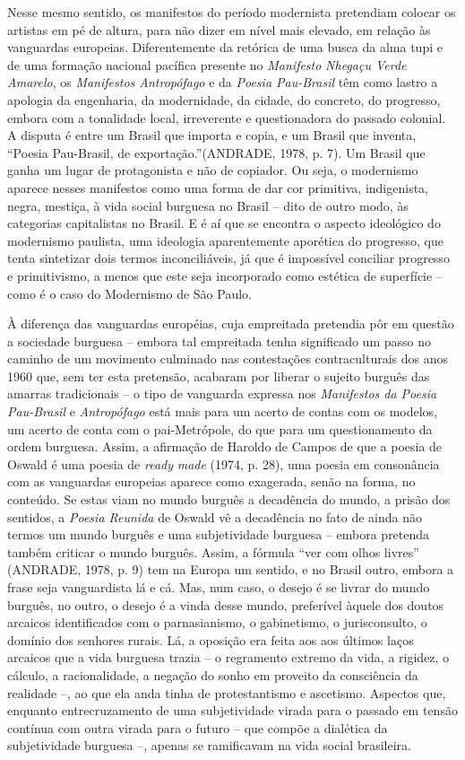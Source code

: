 Nesse mesmo sentido, os manifestos do período modernista pretendiam
colocar os artistas em pé de altura, para não dizer em nível mais
elevado, em relação às vanguardas europeias. Diferentemente da retórica
de uma busca da alma tupi e de uma formação nacional pacífica presente
no \emph{Manifesto} \emph{Nhegaçu Verde Amarelo}, os \emph{Manifestos
Antropófago} e da \emph{Poesia Pau-Brasil} têm como lastro a apologia da
engenharia, da modernidade, da cidade, do concreto, do progresso, embora
com a tonalidade local, irreverente e questionadora do passado colonial.
A disputa é entre um Brasil que importa e copia, e um Brasil que
inventa, ``Poesia Pau-Brasil, de exportação.''(ANDRADE, 1978, p. 7). Um
Brasil que ganha um lugar de protagonista e não de copiador. Ou seja, o
modernismo aparece nesses manifestos como uma forma de dar cor
primitiva, indigenista, negra, mestiça, à vida social burguesa no Brasil
-- dito de outro modo, às categorias capitalistas no Brasil. E é aí que
se encontra o aspecto ideológico do modernismo paulista, uma ideologia
aparentemente aporética do progresso, que tenta sintetizar dois termos
inconciliáveis, já que é impossível conciliar progresso e primitivismo,
a menos que este seja incorporado como estética de superfície -- como é
o caso do Modernismo de São Paulo.

À diferença das vanguardas européias, cuja empreitada pretendia pôr em
questão a sociedade burguesa -- embora tal empreitada tenha significado
um passo no caminho de um movimento culminado nas contestações
contraculturais dos anos 1960 que, sem ter esta pretensão, acabaram por
liberar o sujeito burguês das amarras tradicionais -- o tipo de
vanguarda expressa nos \emph{Manifestos da Poesia Pau-Brasil} e
\emph{Antropófago} está mais para um acerto de contas com os modelos, um
acerto de conta com o pai-Metrópole, do que para um questionamento da
ordem burguesa. Assim, a afirmação de Haroldo de Campos de que a poesia
de Oswald é uma poesia de \emph{ready} \emph{made} (1974, p. 28), uma
poesia em consonância com as vanguardas europeias aparece como
exagerada, senão na forma, no conteúdo. Se estas viam no mundo burguês a
decadência do mundo, a prisão dos sentidos, a \emph{Poesia Reunida} de
Oswald vê a decadência no fato de ainda não termos um mundo burguês e
uma subjetividade burguesa -- embora pretenda também criticar o mundo
burguês. Assim, a fórmula ``ver com olhos livres'' (ANDRADE, 1978, p. 9)
tem na Europa um sentido, e no Brasil outro, embora a frase seja
vanguardista lá e cá. Mas, num caso, o desejo é se livrar do mundo
burguês, no outro, o desejo é a vinda desse mundo, preferível àquele dos
doutos arcaicos identificados com o parnasianismo, o gabinetismo, o
jurisconsulto, o domínio dos senhores rurais. Lá, a oposição era feita
aos aos últimos laços arcaicos que a vida burguesa trazia -- o
regramento extremo da vida, a rigidez, o cálculo, a racionalidade, a
negação do sonho em proveito da consciência da realidade --, ao que ela
anda tinha de protestantismo e ascetismo. Aspectos que, enquanto
entrecruzamento de uma subjetividade virada para o passado em tensão
contínua com outra virada para o futuro -- que compõe a dialética da
subjetividade burguesa --, apenas se ramificavam na vida social
brasileira.

